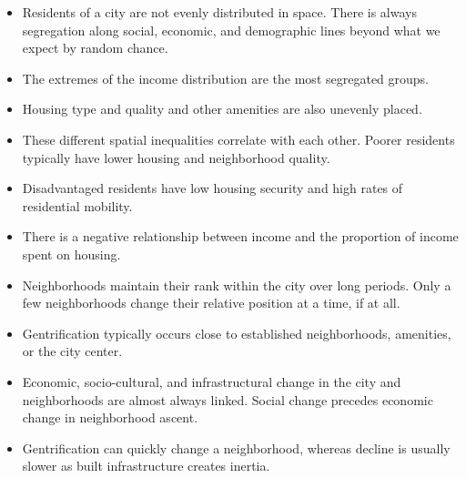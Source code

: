 \begin{itemize}
\item Residents of a city are not evenly distributed in space. There is always segregation along social, economic, and demographic lines beyond what we expect by random chance.
\item The extremes of the income distribution are the most segregated groups.
\item Housing type and quality and other amenities are also unevenly placed.
\item These different spatial inequalities correlate with each other. Poorer residents typically have lower housing and neighborhood quality.
\item Disadvantaged residents have low housing security and high rates of residential mobility.
\item There is a negative relationship between income and the proportion of income spent on housing.
\item Neighborhoods maintain their rank within the city over long periods. Only a few neighborhoods change their relative position at a time, if at all.
\item Gentrification typically occurs close to established neighborhoods, amenities, or the city center.
\item Economic, socio-cultural, and infrastructural change in the city and neighborhoods are almost always linked. Social change precedes economic change in neighborhood ascent.
\item Gentrification can quickly change a neighborhood, whereas decline is usually slower as built infrastructure creates inertia.
\end{itemize}